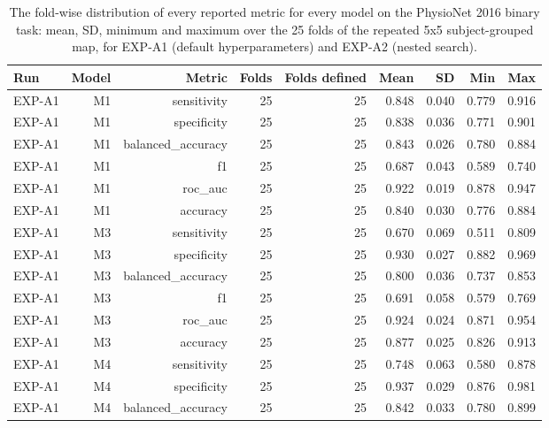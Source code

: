 \begin{table}[htbp]
  \centering
  \caption{The fold-wise distribution of every reported metric for every model on the PhysioNet 2016 binary task: mean, SD, minimum and maximum over the 25 folds of the repeated 5x5 subject-grouped map, for EXP-A1 (default hyperparameters) and EXP-A2 (nested search).}
  \label{tab:t10}
  \begin{tabular}{lrrrrrrrr}
    \toprule
    Run & Model & Metric & Folds & Folds defined & Mean & SD & Min & Max \\
    \midrule
    EXP-A1 & M1 & sensitivity & 25 & 25 & 0.848 & 0.040 & 0.779 & 0.916 \\
    EXP-A1 & M1 & specificity & 25 & 25 & 0.838 & 0.036 & 0.771 & 0.901 \\
    EXP-A1 & M1 & balanced\_accuracy & 25 & 25 & 0.843 & 0.026 & 0.780 & 0.884 \\
    EXP-A1 & M1 & f1 & 25 & 25 & 0.687 & 0.043 & 0.589 & 0.740 \\
    EXP-A1 & M1 & roc\_auc & 25 & 25 & 0.922 & 0.019 & 0.878 & 0.947 \\
    EXP-A1 & M1 & accuracy & 25 & 25 & 0.840 & 0.030 & 0.776 & 0.884 \\
    EXP-A1 & M3 & sensitivity & 25 & 25 & 0.670 & 0.069 & 0.511 & 0.809 \\
    EXP-A1 & M3 & specificity & 25 & 25 & 0.930 & 0.027 & 0.882 & 0.969 \\
    EXP-A1 & M3 & balanced\_accuracy & 25 & 25 & 0.800 & 0.036 & 0.737 & 0.853 \\
    EXP-A1 & M3 & f1 & 25 & 25 & 0.691 & 0.058 & 0.579 & 0.769 \\
    EXP-A1 & M3 & roc\_auc & 25 & 25 & 0.924 & 0.024 & 0.871 & 0.954 \\
    EXP-A1 & M3 & accuracy & 25 & 25 & 0.877 & 0.025 & 0.826 & 0.913 \\
    EXP-A1 & M4 & sensitivity & 25 & 25 & 0.748 & 0.063 & 0.580 & 0.878 \\
    EXP-A1 & M4 & specificity & 25 & 25 & 0.937 & 0.029 & 0.876 & 0.981 \\
    EXP-A1 & M4 & balanced\_accuracy & 25 & 25 & 0.842 & 0.033 & 0.780 & 0.899 \\

\end{tabular}
\end{table}
